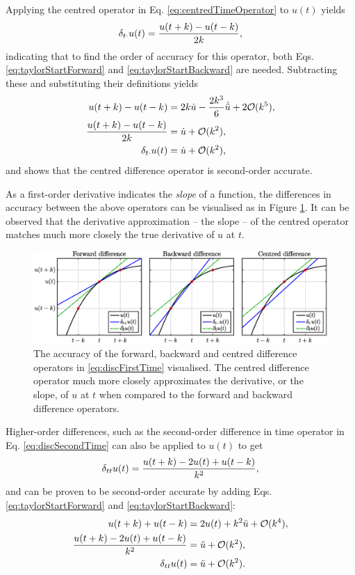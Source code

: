 Applying the centred operator in Eq. \eqref{eq:centredTimeOperator} to $u(t)$ yields
\begin{equation}
    \delta_{t\cdot} u(t) = \frac{u(t+k) - u(t-k)}{2k},
\end{equation}
indicating that to find the order of accuracy for this operator, both Eqs. \eqref{eq:taylorStartForward} and \eqref{eq:taylorStartBackward} are needed. Subtracting these and substituting their definitions yields
\begin{align}
    u(t+k) - u(t-k) &= 2k\dot u - \frac{2k^3}{6}\dot{\ddot{u}} + 2\mathcal{O}(k^5),\nonumber\\
    \frac{u(t+k) - u(t-k)}{2k} &= \dot u + \mathcal{O}(k^2),\nonumber\\
    \delta_{t\cdot} u(t) &= \dot u + \mathcal{O}(k^2),
\end{align}
and shows that the centred difference operator is second-order accurate. 

As a first-order derivative indicates the \textit{slope} of a function, the differences in accuracy between the above operators can be visualised as in Figure \ref{fig:taylor}. It can be observed that the derivative approximation -- the slope -- of the centred operator matches much more closely the true derivative of $u$ at $t$.

\begin{figure}[h]
    \includegraphics[width=\textwidth]{figures/fdtd/taylor.eps}
    \caption{\label{fig:taylor} The accuracy of the forward, backward and centred difference operators in \eqref{eq:discFirstTime} visualised. The centred difference operator much more closely approximates the derivative, or the slope, of $u$ at $t$ when compared to the forward and backward difference operators.}
\end{figure}

Higher-order differences, such as the second-order difference in time operator in Eq. \eqref{eq:discSecondTime} can also be applied to $u(t)$ to get
\begin{equation}
    \delta_{tt} u(t) =  \frac{u(t+k) - 2u(t) + u(t-k)}{k^2},
\end{equation}
and can be proven to be second-order accurate by adding Eqs. \eqref{eq:taylorStartForward} and \eqref{eq:taylorStartBackward}:
\begin{align}
    u(t+k) + u(t-k) &= 2 u(t) + k^2 \ddot u + \mathcal{O}(k^4),\nonumber\\
    \frac{u(t+k) -2 u(t) + u(t-k)}{k^2} &= \ddot u + \mathcal{O}(k^2),\nonumber\\
    \delta_{tt} u(t) &= \ddot u + \mathcal{O}(k^2).
\end{align}

